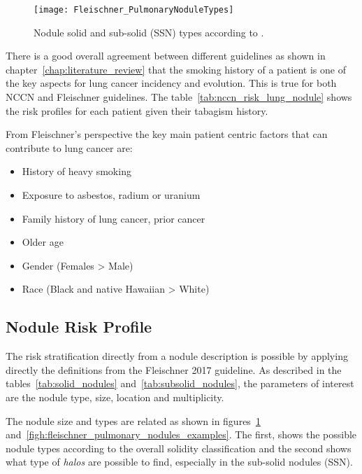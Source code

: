 \begin{center}
\begin{figure}
\begin{centering}
\texttt{[image: Fleischner\_PulmonaryNoduleTypes]}
\par\end{centering}
\caption{\label{figh:fleischner_pulmonary_nodules_types}Nodule solid and sub-solid (SSN) types according to .}
\end{figure}
\vspace*{-38pt}
\end{center}

There is a good overall agreement between different guidelines as shown in chapter~\ref{chap:literature_review} that the smoking history of a patient is one of the key aspects for lung cancer incidency and evolution. This is true for both NCCN and Fleischner guidelines. The table~\ref{tab:nccn_risk_lung_nodule} shows the risk profiles for each patient given their tabagism history. 

From Fleischner's perspective the key main patient centric factors that can contribute to lung cancer are:

\begin{itemize}
  \item History of heavy smoking
  \item Exposure to asbestos, radium or uranium
  \item Family history of lung cancer, prior cancer
  \item Older age
  \item Gender (Females > Male)
  \item Race (Black and native Hawaiian > White)
\end{itemize}

\subsection{Nodule Risk Profile}

The risk stratification directly from a nodule description is possible by applying directly the definitions from the Fleischner 2017 guideline. As described in the tables~\ref{tab:solid_nodules} and~\ref{tab:subsolid_nodules}, the parameters of interest are the nodule type, size, location and multiplicity. 

The nodule size and types are related as shown in figures~\ref{figh:fleischner_pulmonary_nodules_types} and~\ref{figh:fleischner_pulmonary_nodules_examples}. The first, shows the possible nodule types according to the overall solidity classification and the second shows what type of \emph{halos} are possible to find, especially in the sub-solid nodules (SSN).


